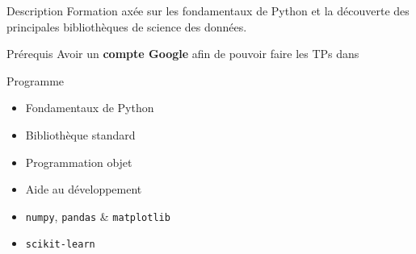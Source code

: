 \begin{frame}{Description}
  Formation axée sur les fondamentaux de Python et la découverte des principales bibliothèques de science des données.
\end{frame}

\begin{frame}{Prérequis}
  Avoir un \textbf{compte Google} afin de pouvoir faire les TPs dans 
\end{frame}

\begin{frame}{Programme}
  \begin{itemize}
    \item Fondamentaux de Python
    \item Bibliothèque standard
    \item Programmation objet
    \item Aide au développement
    \item \texttt{numpy}, \texttt{pandas} \& \texttt{matplotlib}
    \item \texttt{scikit-learn}
  \end{itemize}
\end{frame}

